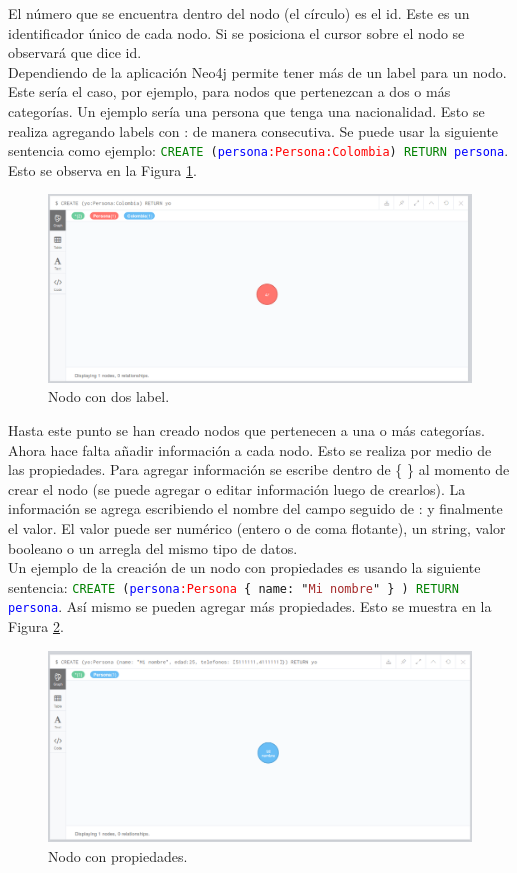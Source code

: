 \documentclass[conference]{IEEEtran}
\begin{document}
El número que se encuentra dentro del nodo (el círculo) es el id. Este es un identificador único de cada nodo. Si se posiciona el cursor sobre el nodo se observará que dice id.
\\
Dependiendo de la aplicación Neo4j permite tener más de un label para un nodo. Este sería el caso, por ejemplo, para nodos que pertenezcan a dos o más categorías. Un ejemplo sería una persona que tenga una nacionalidad. Esto se realiza agregando labels con : de manera consecutiva. Se puede usar la siguiente sentencia como ejemplo: \texttt{\textcolor{green}{CREATE} (\textcolor{blue}{persona}\textcolor{red}{:Persona:Colombia}) \textcolor{green}{RETURN} \textcolor{blue}{persona}}. Esto se observa en la Figura \ref{fig18}.

\begin{figure}[H]
\begin{center}
\includegraphics[width= 0.45 \textwidth]{crear_nodo_label2.png}
\end{center}
\caption{Nodo con dos label.}
\label{fig18}
\end{figure}

Hasta este punto se han creado nodos que pertenecen a una o más categorías. Ahora hace falta añadir información a cada nodo. Esto se realiza por medio de las propiedades. Para agregar información se escribe dentro de \{ \} al momento de crear el nodo (se puede agregar o editar información luego de crearlos). La información se agrega escribiendo el nombre del campo seguido de : y finalmente el valor. El valor puede ser numérico (entero o de coma flotante), un string, valor booleano o un arregla del mismo tipo de datos.
\\
Un ejemplo de la creación de un nodo con propiedades es usando la siguiente sentencia:  \texttt{\textcolor{green}{CREATE} (\textcolor{blue}{persona}\textcolor{red}{:Persona} \{ name:  "\textcolor{brown}{Mi nombre}" \} ) \textcolor{green}{RETURN} \textcolor{blue}{persona}}. Así mismo se pueden agregar más propiedades. Esto se muestra en la Figura \ref{fig19}.

\begin{figure}[H]
\begin{center}
\includegraphics[width= 0.45 \textwidth]{crear_nodo_prop1.png}
\end{center}
\caption{Nodo con propiedades.}
\label{fig19}
\end{figure}
\end{document}
